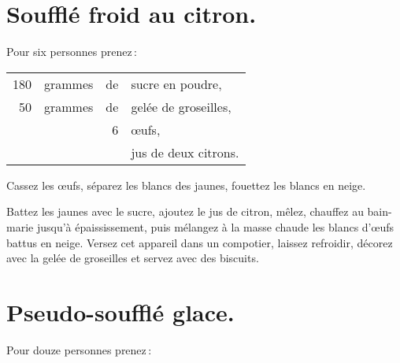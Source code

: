 \section*{\centering Soufflé froid au citron.}
{}

Pour six personnes prenez :

\footnotesize
\begin{longtable}{rrrp{16em}}
    180 & grammes & de & sucre en poudre,                                                                 \\
     50 & grammes & de & gelée de groseilles,                                                             \\
        &         &  6 & œufs,                                                                            \\
        &         &    & jus de deux citrons.                                                             \\
\end{longtable}
\normalsize

Cassez les œufs, séparez les blancs des jaunes, fouettez les blancs en neige.

Battez les jaunes avec le sucre, ajoutez le jus de citron, mêlez, chauffez au
bain-marie jusqu'à épaississement, puis mélangez à la masse chaude les blancs
d'œufs battus en neige. Versez cet appareil dans un compotier, laissez
refroidir, décorez avec la gelée de groseilles et servez avec des biscuits.

\section*{\centering Pseudo-soufflé glace.}
{}

Pour douze personnes prenez :

